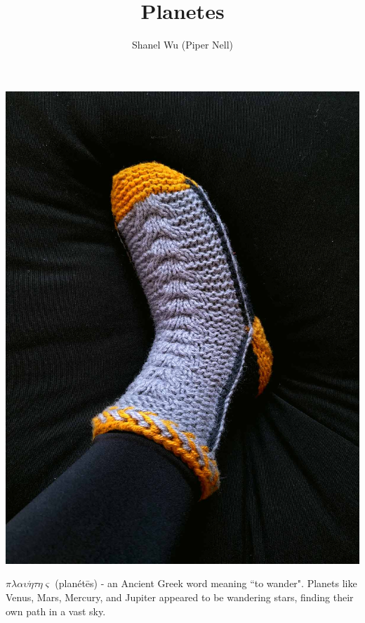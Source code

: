\documentclass[12pt]{article}
\title{Planetes} %
\author{Shanel Wu (Piper Nell)}
\begin{document}


{\selectfont
\HUGE\textbf{\thetitle}
\hspace{2em} \hfill %
\normalsize\theauthor
}

\begin{multicols}{2}
\small

\includegraphics[width=\linewidth]{Photos/smallVersions/Planetes_R3}

\vspace{1em}
$\pi\lambda\alpha\upsilon\acute{\eta}\tau\eta\varsigma$ (plan\'{e}t\={e}s) - an Ancient Greek word meaning ``to wander". Planets like Venus, Mars, Mercury, and Jupiter appeared to be wandering stars, finding their own path in a vast sky.


\end{multicols}
\end{document}
